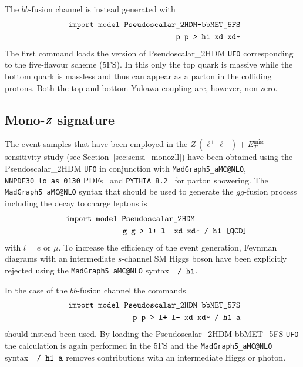 \documentclass[a4paper, 11pt,notoc]{article}
\newcommand{\MET}{\ensuremath{E_T^\mathrm{miss}}\xspace}
\def\bm#1{\mbox{\boldmath$#1$\unboldmath}}
\begin{document}
The $b \bar b$-fusion channel is instead generated with 
\begin{eqnarray}
&& \verb| import model Pseudoscalar_2HDM-bbMET_5FS  | \nonumber \\
&& \verb| p p > h1 xd xd~  | \nonumber 
\end{eqnarray}
The first command loads the version of Pseudoscalar\_2HDM {\tt UFO}  corresponding to the five-flavour scheme (5FS). In this only the top quark is massive while the bottom quark is massless and thus 
can appear as a parton in the colliding protons. Both the top and bottom Yukawa coupling  are, however, non-zero.

\subsection[Mono-$Z$ signature]{Mono-$\bm{Z}$ signature}

The event samples that have been employed in the $Z \, (\ell^+ \ell^-) + \MET$ sensitivity study (see Section~\ref{sec:sensi_monozll}) have been obtained using the Pseudoscalar\_2HDM {\tt UFO} in conjunction with {\tt MadGraph5\_aMC@NLO}, {\tt NNPDF30\_lo\_as\_0130} PDFs~\cite{Ball:2014uwa} and  {\tt PYTHIA~8.2}~\cite{Sjostrand:2014zea} for parton showering.  The {\tt MadGraph5\_aMC@NLO}  syntax that should be used to generate the $gg$-fusion process including the decay to charge leptons is 
\begin{eqnarray}
&& \verb| import model Pseudoscalar_2HDM | \hspace{2.25cm} \nonumber \\
&& \verb| g g > l+ l- xd xd~ / h1 [QCD] | \nonumber 
\end{eqnarray}
with $l = e$ or $\mu$.  To increase the efficiency of the event generation, Feynman diagrams with an intermediate $s$-channel SM Higgs boson have been explicitly rejected using the  {\tt MadGraph5\_aMC@NLO} syntax~~$\verb|/ h1|$. 

In the case of the $b \bar b$-fusion channel the commands 
\begin{eqnarray}
&& \verb| import model Pseudoscalar_2HDM-bbMET_5FS  | \nonumber \\
&& \verb| p p > l+ l- xd xd~ / h1 a  | \nonumber 
\end{eqnarray}
should instead been used.  By loading the Pseudoscalar\_2HDM-bbMET\_5FS  {\tt UFO}  the calculation is again performed in the 5FS and the  {\tt MadGraph5\_aMC@NLO} syntax~~$\verb|/ h1 a|$ removes contributions with an intermediate Higgs or photon.  
\end{document}

